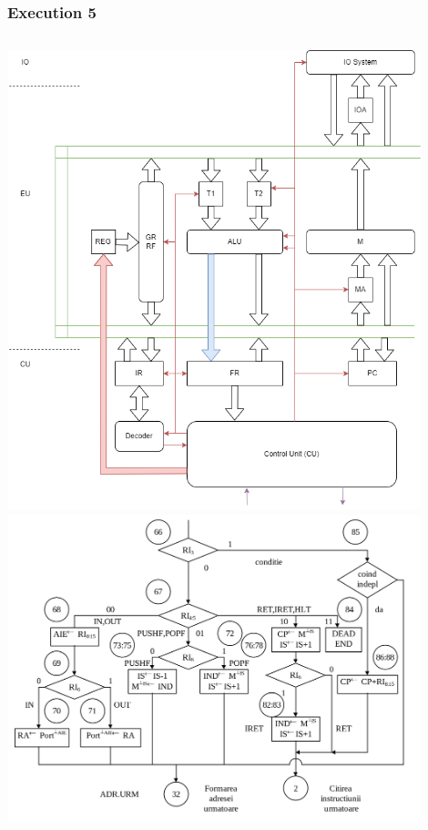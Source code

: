 \begin{frame}
    \frametitle{Execution 5}
    \begin{columns}
    \includegraphics[width=0.9\textwidth]{media/architecture.png}
    \includegraphics[width=0.9\textwidth]{media/cdtree5.png}
    \end{columns}
    \end{frame}